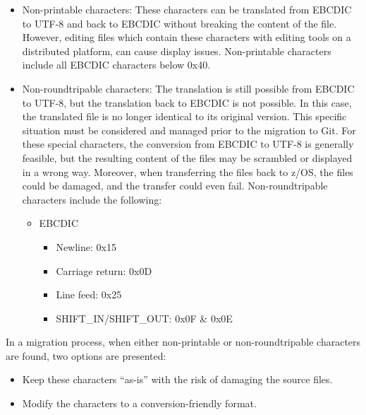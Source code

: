 \documentclass[
  letterpaper,
  DIV=11,
  numbers=noendperiod]{scrartcl}
\providecommand{\tightlist}{%
  \setlength{\itemsep}{0pt}\setlength{\parskip}{0pt}}\usepackage{longtable,booktabs,array}
\begin{document}
\begin{itemize}
\tightlist
\item
  Non-printable characters: These characters can be translated from
  EBCDIC to UTF-8 and back to EBCDIC without breaking the content of the
  file. However, editing files which contain these characters with
  editing tools on a distributed platform, can cause display issues.
  Non-printable characters include all EBCDIC characters below 0x40.
\item
  Non-roundtripable characters: The translation is still possible from
  EBCDIC to UTF-8, but the translation back to EBCDIC is not possible.
  In this case, the translated file is no longer identical to its
  original version. This specific situation must be considered and
  managed prior to the migration to Git. For these special characters,
  the conversion from EBCDIC to UTF-8 is generally feasible, but the
  resulting content of the files may be scrambled or displayed in a
  wrong way. Moreover, when transferring the files back to z/OS, the
  files could be damaged, and the transfer could even fail.
  Non-roundtripable characters include the following:

  \begin{itemize}
  \tightlist
  \item
    EBCDIC

    \begin{itemize}
    \tightlist
    \item
      Newline: 0x15
    \item
      Carriage return: 0x0D
    \item
      Line feed: 0x25
    \item
      SHIFT\_IN/SHIFT\_OUT: 0x0F \& 0x0E
    \end{itemize}
  \end{itemize}
\end{itemize}

In a migration process, when either non-printable or non-roundtripable
characters are found, two options are presented:

\begin{itemize}
\tightlist
\item
  Keep these characters ``as-is'' with the risk of damaging the source
  files.
\item
  Modify the characters to a conversion-friendly format.
\end{itemize}
\end{document}
